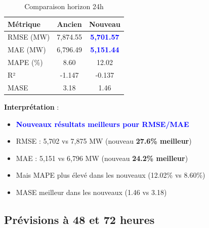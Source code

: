 \documentclass[12pt,a4paper]{article}
\begin{document}
\begin{table}[h]
\centering
\caption{Comparaison horizon 24h}
\label{tab:h24}
\begin{tabular}{lcc}
\toprule
\textbf{Métrique} & \textbf{Ancien} & \textbf{Nouveau} \\
\midrule
RMSE (MW) & 7,874.55 & \textcolor{blue}{\textbf{5,701.57}} \\
MAE (MW) & 6,796.49 & \textcolor{blue}{\textbf{5,151.44}} \\
MAPE (\%) & 8.60 & 12.02 \\
R² & -1.147 & -0.137 \\
MASE & 3.18 & 1.46 \\
\bottomrule
\end{tabular}
\end{table}

\textbf{Interprétation} :
\begin{itemize}
    \item \textcolor{blue}{\textbf{Nouveaux résultats meilleurs pour RMSE/MAE}}
    \item RMSE : 5,702 vs 7,875 MW (nouveau \textbf{27.6\% meilleur})
    \item MAE : 5,151 vs 6,796 MW (nouveau \textbf{24.2\% meilleur})
    \item Mais MAPE plus élevé dans les nouveaux (12.02\% vs 8.60\%)
    \item MASE meilleur dans les nouveaux (1.46 vs 3.18)
\end{itemize}

\subsection{Prévisions à 48 et 72 heures}
\end{document}
